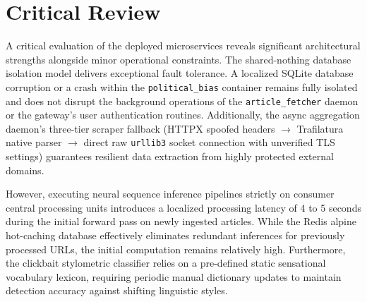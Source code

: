 \section{Critical Review}
A critical evaluation of the deployed microservices reveals significant architectural strengths alongside minor operational constraints. The shared-nothing database isolation model delivers exceptional fault tolerance. A localized SQLite database corruption or a crash within the \texttt{political\_bias} container remains fully isolated and does not disrupt the background operations of the \texttt{article\_fetcher} daemon or the gateway's user authentication routines. Additionally, the async aggregation daemon's three-tier scraper fallback (HTTPX spoofed headers $\rightarrow$ Trafilatura native parser $\rightarrow$ direct raw \texttt{urllib3} socket connection with unverified TLS settings) guarantees resilient data extraction from highly protected external domains.

However, executing neural sequence inference pipelines strictly on consumer central processing units introduces a localized processing latency of 4 to 5 seconds during the initial forward pass on newly ingested articles. While the Redis alpine hot-caching database effectively eliminates redundant inferences for previously processed URLs, the initial computation remains relatively high. Furthermore, the clickbait stylometric classifier relies on a pre-defined static sensational vocabulary lexicon, requiring periodic manual dictionary updates to maintain detection accuracy against shifting linguistic styles.

